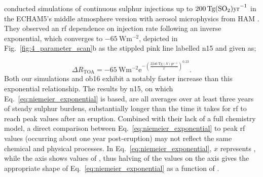 \documentclass{ametsocV6.1}
\begin{document}
\citet{niemeier2015} conducted simulations of continuous sulphur injections up to
\(\SI{200}{\tera\gram(\ce{SO2})\mathrm{yr}^{-1}}\) in the ECHAM5's middle atmosphere
version \citep{giorgetta2006} with aerosol microphysics from HAM \citep{stier2005}. They
observed an \gls{rf} dependence on  injection rate following an inverse
exponential, which converges to \(\SI{-65}{\watt\meter^{-2}}\), depicted in
Fig.~\ref{fig:4_parameter_scan}b as the stippled pink line labelled \gls{n15} and given
as;

\begin{equation}
  \Delta
  R_{\mathrm{TOA}} =
  -\SI{65}{\watt\metre^{-2}}
  \mathrm{e}^{-{\left(\frac{\SI{2246}{\tera\gram(S)yr^{-1}}}{x}\right)}^{0.23}}.
  \label{eq:niemeier_exponential}
\end{equation}
%
Both our simulations and \gls{ob16} exhibit a notably faster increase than this
exponential relationship. The results by \gls{n15}, on which
Eq.~\ref{eq:niemeier_exponential} is based, are all averages over at least three years
of steady sulphur burdens, substantially longer than the time it takes for \gls{rf} to
reach peak values after an eruption. Combined with their lack of a full chemistry model,
a direct comparison between Eq.~\ref{eq:niemeier_exponential} to peak \gls{rf} values
(occurring about one year post-eruption) may not reflect the same chemical and physical
processes. In Eq.~\ref{eq:niemeier_exponential}, \(x\) represents , while the axis
shows values of , thus halving of the  values on the axis gives the
appropriate shape of Eq.~\ref{eq:niemeier_exponential} as a function of .
\end{document}
